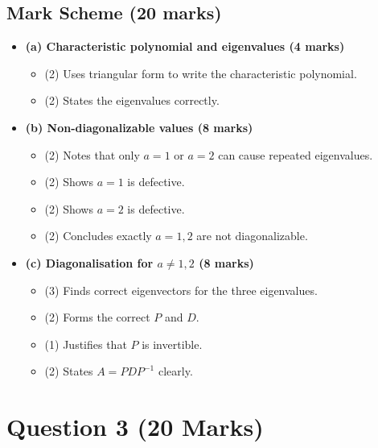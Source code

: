 \documentclass[12pt]{article}
\begin{document}
\subsection{Mark Scheme (20 marks)}
\begin{itemize}[leftmargin=1.6em]
  \item \textbf{(a) Characteristic polynomial and eigenvalues (4 marks)}
  \begin{itemize}[leftmargin=1.6em]
    \item (2) Uses triangular form to write the characteristic polynomial.
    \item (2) States the eigenvalues correctly.
  \end{itemize}
  \item \textbf{(b) Non-diagonalizable values (8 marks)}
  \begin{itemize}[leftmargin=1.6em]
    \item (2) Notes that only $a=1$ or $a=2$ can cause repeated eigenvalues.
    \item (2) Shows $a=1$ is defective.
    \item (2) Shows $a=2$ is defective.
    \item (2) Concludes exactly $a=1,2$ are not diagonalizable.
  \end{itemize}
  \item \textbf{(c) Diagonalisation for $a\ne1,2$ (8 marks)}
  \begin{itemize}[leftmargin=1.6em]
    \item (3) Finds correct eigenvectors for the three eigenvalues.
    \item (2) Forms the correct $P$ and $D$.
    \item (1) Justifies that $P$ is invertible.
    \item (2) States $A=PDP^{-1}$ clearly.
  \end{itemize}
\end{itemize}

\newpage
\section{Question 3 \hfill (20 Marks)}
\end{document}
